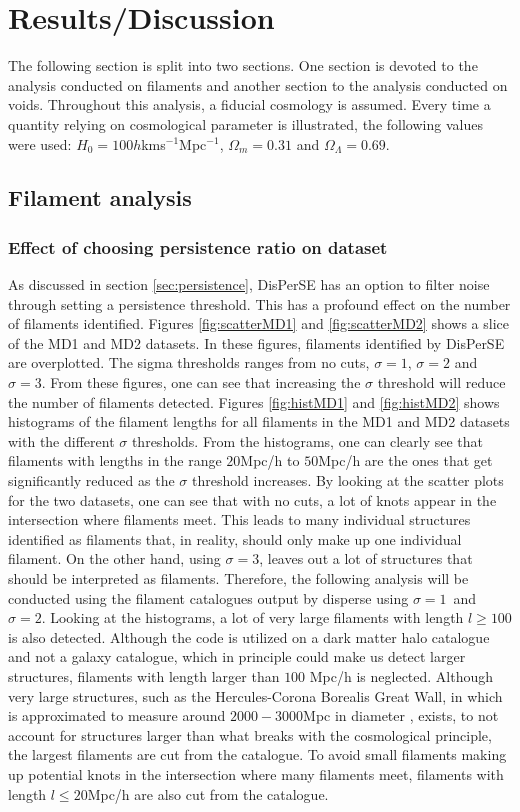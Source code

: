 \chapter{Results/Discussion}\label{sec:results}
The following section is split into two sections. One section is devoted to the analysis conducted on filaments and another section to the analysis conducted on voids. Throughout this analysis, a fiducial cosmology is assumed. Every time a quantity relying on cosmological parameter is illustrated, the following values were used: $H_0=100h$kms$^{-1}$Mpc$^{-1}$, $\Omega_m=0.31$ and $\Omega_\Lambda=0.69$. 
\section{Filament analysis}\label{sec:filaments}

\subsection{Effect of choosing persistence ratio on dataset}
As discussed in section \ref{sec:persistence}, DisPerSE has an option to filter
noise through setting a persistence threshold. This has a profound effect on the number of filaments identified. Figures \ref{fig:scatterMD1} and \ref{fig:scatterMD2} shows a slice of the MD1 and MD2 datasets. In these figures, filaments identified by DisPerSE are overplotted. The sigma thresholds ranges from no cuts, $\sigma=1$, $\sigma=2$ and $\sigma=3$. From these figures, one can see that increasing the $\sigma$ threshold will reduce the number of filaments detected. Figures \ref{fig:histMD1} and \ref{fig:histMD2} shows histograms of the filament lengths for all filaments in the MD1 and MD2 datasets with the different $\sigma$ thresholds. From the histograms, one can clearly see that filaments with lengths in the range $20$Mpc/h to $50$Mpc/h are the ones that get significantly reduced as the $\sigma$ threshold increases. By looking at the scatter plots for the two datasets, one can see that with no cuts, a lot of knots appear in the intersection where filaments meet. This leads to many individual structures identified as filaments that, in reality, should only make up one individual filament. On the other hand, using $\sigma=3$, leaves out a lot of structures that should be interpreted as filaments. Therefore, the following analysis will be conducted using the filament catalogues output by disperse using $\sigma=1$ and $\sigma=2$. Looking at the histograms, a lot of very large filaments with length $l\geq 100$ is also detected. Although the code is utilized on a dark matter halo catalogue and not a galaxy catalogue, which in principle could make us detect larger structures, filaments with length larger than $100$ Mpc/h is neglected. Although very large structures, such as the Hercules-Corona Borealis Great Wall, in which is approximated to measure around $2000-3000$Mpc in diameter \cite{herculescorona}, exists, to not account for structures larger than what breaks with the cosmological principle, the largest filaments are cut from the catalogue. To avoid small filaments making up potential knots in the intersection where many filaments meet, filaments with length $l\leq 20$Mpc/h are also cut from the catalogue.
